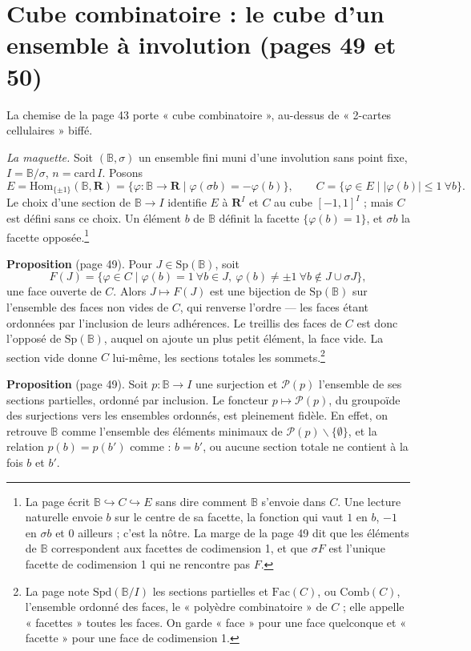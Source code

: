 \documentclass[11pt,a4paper]{article}
\begin{document}
\section*{Cube combinatoire : le cube d'un ensemble à involution (pages 49 et 50)}

La chemise de la page 43 porte « cube combinatoire », au-dessus de
« 2-cartes cellulaires » biffé.

\emph{La maquette.} Soit $(\mathbb{B}, \sigma)$ un ensemble fini muni d'une
involution sans point fixe, $I = \mathbb{B}/\sigma$, $n = \mathrm{card}\, I$.
Posons
\[
  E = \mathrm{Hom}_{\{\pm 1\}}(\mathbb{B}, \mathbf{R}) = \{\varphi :
  \mathbb{B} \to \mathbf{R} \mid \varphi(\sigma b) = -\varphi(b)\} , \qquad
  C = \{\varphi \in E \mid |\varphi(b)| \leqslant 1 \ \forall b\} .
\]
Le choix d'une section de $\mathbb{B} \to I$ identifie $E$ à $\mathbf{R}^I$ et
$C$ au cube $[-1, 1]^I$ ; mais $C$ est défini sans ce choix. Un élément $b$
de $\mathbb{B}$ définit la facette $\{\varphi(b) = 1\}$, et $\sigma b$ la
facette opposée.\footnote{La page écrit $\mathbb{B} \hookrightarrow C
\hookrightarrow E$ sans dire comment $\mathbb{B}$ s'envoie dans $C$. Une
lecture naturelle envoie $b$ sur le centre de sa facette, la fonction qui vaut
$1$ en $b$, $-1$ en $\sigma b$ et $0$ ailleurs ; c'est la nôtre. La marge
de la page 49 dit que les éléments de $\mathbb{B}$ correspondent aux facettes
de codimension 1, et que $\sigma F$ est l'unique facette de codimension 1 qui
ne rencontre pas $F$.}

\textbf{Proposition} (page 49). Pour $J \in \mathrm{Sp}(\mathbb{B})$, soit
\[
  F(J) = \{\varphi \in C \mid \varphi(b) = 1 \ \forall b \in J, \
  \varphi(b) \neq \pm 1 \ \forall b \notin J \cup \sigma J\} ,
\]
une face ouverte de $C$. Alors $J \mapsto F(J)$ est une bijection de
$\mathrm{Sp}(\mathbb{B})$ sur l'ensemble des faces non vides de $C$, qui
renverse l'ordre --- les faces étant ordonnées par l'inclusion de leurs
adhérences. Le treillis des faces de $C$ est donc l'opposé de
$\mathrm{Sp}(\mathbb{B})$, auquel on ajoute un plus petit élément, la face
vide. La section vide donne $C$ lui-même, les sections totales les
sommets.\footnote{La page note $\mathrm{Spd}(\mathbb{B}/I)$ les sections
partielles et $\mathrm{Fac}(C)$, ou $\mathrm{Comb}(C)$, l'ensemble ordonné des
faces, le « polyèdre combinatoire » de $C$ ; elle appelle « facettes » toutes
les faces. On garde « face » pour une face quelconque et « facette » pour une
face de codimension 1.}

\textbf{Proposition} (page 49). Soit $p : \mathbb{B} \to I$ une surjection et
$\mathcal{P}(p)$ l'ensemble de ses sections partielles, ordonné par
inclusion. Le foncteur $p \mapsto \mathcal{P}(p)$, du groupoïde des
surjections vers les ensembles ordonnés, est pleinement fidèle. En effet, on
retrouve $\mathbb{B}$ comme l'ensemble des éléments minimaux de
$\mathcal{P}(p) \smallsetminus \{\emptyset\}$, et la relation $p(b) = p(b')$
comme : $b = b'$, ou aucune section totale ne contient à la fois $b$ et $b'$.
\end{document}
